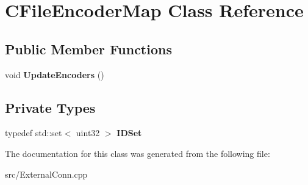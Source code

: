 \section{CFileEncoderMap Class Reference}
\label{classCFileEncoderMap}
\subsection*{Public Member Functions}
\begin{DoxyCompactItemize}
\item 
void {\bfseries UpdateEncoders} ()\label{classCFileEncoderMap_adb35837de60e652534ad8551a31137d3}

\end{DoxyCompactItemize}
\subsection*{Private Types}
\begin{DoxyCompactItemize}
\item 
typedef std::set$<$ uint32 $>$ {\bfseries IDSet}\label{classCFileEncoderMap_a61649408268a6551224d585b7cfd9094}

\end{DoxyCompactItemize}


The documentation for this class was generated from the following file:\begin{DoxyCompactItemize}
\item 
src/ExternalConn.cpp\end{DoxyCompactItemize}
